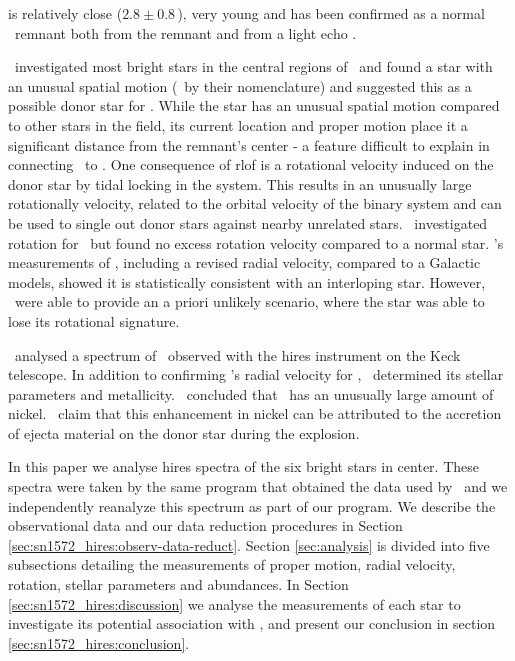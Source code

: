  is relatively close ($2.8\pm0.8$\,\kpc), very young and has been confirmed as a normal \snia\ remnant both from the remnant \citep{2006ApJ...645.1373B} and from a light echo \citep{2008Natur.456..617K}. 


\rl\ investigated most bright stars in the central regions of \ and found a star with an unusual spatial motion (\starg\ by their nomenclature) and suggested this as a possible donor star for . While the star has an unusual spatial motion compared to other stars in the field, its current location and proper motion place it a significant distance from the remnant's center - a feature difficult to explain in connecting \starg\ to . One consequence of \gls{rlof} is a rotational velocity induced on the \gls{donor} star by tidal locking in the system. This results in an unusually large rotationally velocity, related to the orbital velocity of the binary system and can be used to single out donor stars against nearby unrelated stars. \wek\ investigated rotation for  \starg\ but found no excess rotation velocity compared to a normal star. \wek's measurements of \starg, including a revised radial velocity, compared to a Galactic models, showed it is statistically consistent with an interloping star. However, \wek\ were able to provide an a priori unlikely scenario, where the star was able to lose its rotational signature. 

\gh\ analysed a spectrum of \starg\ observed with the \gls{hires} instrument on the Keck telescope. In addition to confirming \wek's radial velocity for \starg, \gh\ determined its stellar parameters and metallicity. \gh\ concluded that \starg\ has an unusually large amount of nickel. \gh\ claim that this enhancement in nickel can be attributed to the accretion of ejecta material on the \gls{donor} star during the explosion. 

In this paper we analyse \gls{hires} spectra of the six bright stars in  center. These spectra were taken by the same program that obtained the data used by \gh\ and we independently reanalyze this spectrum as part of our program. We describe the observational data and our data reduction procedures in Section \ref{sec:sn1572_hires:observ-data-reduct}. Section \ref{sec:analysis} is divided into five subsections detailing the measurements of proper motion, radial velocity, rotation, stellar parameters and abundances. In Section \ref{sec:sn1572_hires:discussion} we analyse the measurements of each star to investigate its potential association with , and present our conclusion in section \ref{sec:sn1572_hires:conclusion}.

